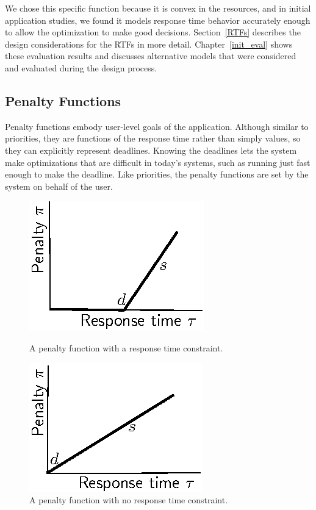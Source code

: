 We chose this specific function because it is convex in the resources, and in initial application studies,
we found it models response time behavior accurately enough to allow the optimization to make good decisions. Section~\ref{RTFs} describes the design considerations for the RTFs in more detail. Chapter~\ref{init_eval} shows these evaluation results and discusses alternative models that were considered and evaluated during the design process.

\subsection{Penalty Functions}

Penalty functions embody user-level goals of
the application. Although similar to priorities, they are functions of
the response time rather than simply values, so they can explicitly
represent deadlines.  Knowing the deadlines lets the system make
optimizations that are difficult in today's systems, such as running
just fast enough to make the deadline. Like priorities, the penalty
functions are set by the system on behalf of the user.


\begin{figure}[hb]
\parbox{3in}{
\includegraphics*[width=.45\columnwidth]{Figures/Penalty1.eps}
\caption{\label{f:pen1}A penalty function with a response time constraint.}
}
\hspace{\fill}
\parbox{3in}{
\includegraphics*[width=.45\columnwidth]{Figures/Penalty2.eps}
\caption{\label{f:pen2}A penalty function with no response time constraint.}
}
\end{figure}


